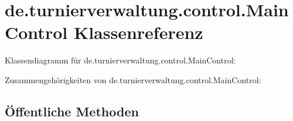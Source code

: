 \hypertarget{classde_1_1turnierverwaltung_1_1control_1_1_main_control}{}\section{de.\+turnierverwaltung.\+control.\+Main\+Control Klassenreferenz}
\label{classde_1_1turnierverwaltung_1_1control_1_1_main_control}


Klassendiagramm für de.\+turnierverwaltung.\+control.\+Main\+Control\+:


Zusammengehörigkeiten von de.\+turnierverwaltung.\+control.\+Main\+Control\+:
\subsection*{Öffentliche Methoden}
